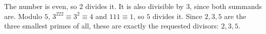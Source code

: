 The number is even, so $2$ divides it. It is also divisible by $3$, since both summands are. Modulo $5$, $3^{222}\equiv3^2\equiv4$ and $111\equiv1$, so $5$ divides it. Since $2,3,5$ are the three smallest primes of all, these are exactly the requested divisors: $\boxed{2,3,5}$.
